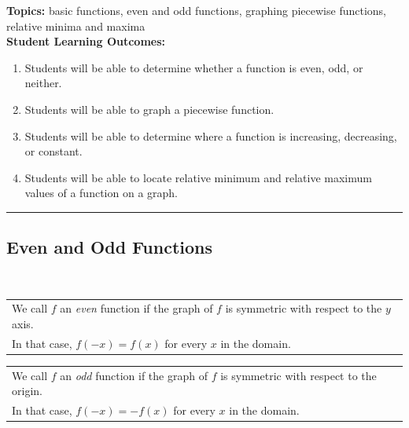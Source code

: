 
\noindent \textbf{Topics:}  basic functions, even and odd functions, graphing piecewise functions, relative minima and maxima\\

\noindent \textbf{Student Learning Outcomes:}
\begin{enumerate}
\item Students will be able to determine whether a function is even, odd, or neither.
\item Students will be able to graph a piecewise function.
\item Students will be able to determine where a function is increasing, decreasing, or constant.
\item  Students will be able to locate relative minimum and relative maximum values of a function on a graph.
\end{enumerate}

\hrule 

\bigskip

\subsection{Even and Odd Functions} ~


\noindent \begin{tabular}{| l |} \hline
We call $f$ an \emph{even} function if the graph of $f$ is symmetric with respect to the $y$ axis.\\ In that case, $f(-x)=f(x)$ for every $x$ in the domain. \\ \hline
\end{tabular}



\noindent \begin{tabular}{| l |} \hline
We call $f$ an \emph{odd} function if the graph of $f$ is symmetric with respect to the origin.\\ In that case, $f(-x)=-f(x)$ for every $x$ in the domain. \\ \hline
\end{tabular}



